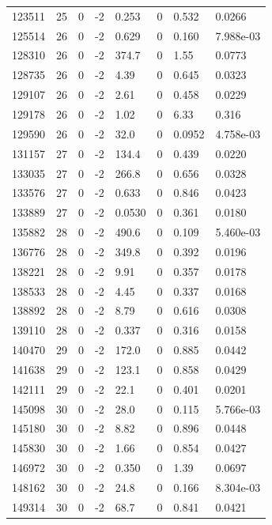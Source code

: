\documentclass[preview]{standalone}
\begin{document}
{{{{{{{{\begin{tabular}{L{1.2cm}C{1.2cm} C{0.3cm}C{0.5cm} C{1.4cm}C{1.4cm} C{1.4cm}C{1.4cm}}
  123511  &    25  & 0     & -2 &  0.253  & 0  & 0.532 &  0.0266   \\ 
  125514  &    26  & 0     & -2 &  0.629  & 0  & 0.160 &  7.988e-03   \\ 
  128310  &    26  & 0     & -2 &  374.7  & 0  & 1.55 &  0.0773   \\ 
  128735  &    26  & 0     & -2 &  4.39  & 0  & 0.645 &  0.0323   \\ 
  129107  &    26  & 0     & -2 &  2.61  & 0  & 0.458 &  0.0229   \\ 
  129178  &    26  & 0     & -2 &  1.02  & 0  & 6.33 &  0.316   \\ 
  129590  &    26  & 0     & -2 &  32.0  & 0  & 0.0952 &  4.758e-03   \\ 
  131157  &    27  & 0     & -2 &  134.4  & 0  & 0.439 &  0.0220   \\ 
  133035  &    27  & 0     & -2 &  266.8  & 0  & 0.656 &  0.0328   \\ 
  133576  &    27  & 0     & -2 &  0.633  & 0  & 0.846 &  0.0423   \\ 
  133889  &    27  & 0     & -2 &  0.0530  & 0  & 0.361 &  0.0180   \\ 
  135882  &    28  & 0     & -2 &  490.6  & 0  & 0.109 &  5.460e-03   \\ 
  136776  &    28  & 0     & -2 &  349.8  & 0  & 0.392 &  0.0196   \\ 
  138221  &    28  & 0     & -2 &  9.91  & 0  & 0.357 &  0.0178   \\ 
  138533  &    28  & 0     & -2 &  4.45  & 0  & 0.337 &  0.0168   \\ 
  138892  &    28  & 0     & -2 &  8.79  & 0  & 0.616 &  0.0308   \\ 
  139110  &    28  & 0     & -2 &  0.337  & 0  & 0.316 &  0.0158   \\ 
  140470  &    29  & 0     & -2 &  172.0  & 0  & 0.885 &  0.0442   \\ 
  141638  &    29  & 0     & -2 &  123.1  & 0  & 0.858 &  0.0429   \\ 
  142111  &    29  & 0     & -2 &  22.1  & 0  & 0.401 &  0.0201   \\ 
  145098  &    30  & 0     & -2 &  28.0  & 0  & 0.115 &  5.766e-03   \\ 
  145180  &    30  & 0     & -2 &  8.82  & 0  & 0.896 &  0.0448   \\ 
  145830  &    30  & 0     & -2 &  1.66  & 0  & 0.854 &  0.0427   \\ 
  146972  &    30  & 0     & -2 &  0.350  & 0  & 1.39 &  0.0697   \\ 
  148162  &    30  & 0     & -2 &  24.8  & 0  & 0.166 &  8.304e-03   \\ 
  149314  &    30  & 0     & -2 &  68.7  & 0  & 0.841 &  0.0421   \\ 
\hline 
\end{tabular} 

}}}}}}}}
\end{document}
